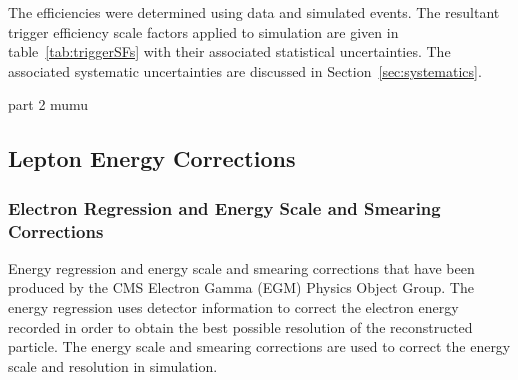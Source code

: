 The efficiencies were determined using data and simulated \ttbar events.
The resultant trigger efficiency scale factors applied to simulation are given in table~\ref{tab:triggerSFs} with their associated statistical uncertainties.
The associated systematic uncertainties are discussed in Section~\ref{sec:systematics}.

\begin{table}[htbp]
\label{tab:triggerSFs}
  \centering
\end{table}

 part 2 mumu


\subsection{Lepton Energy Corrections}\label{subsec:leptonEnergyCorrections}
\subsubsection{Electron Regression and Energy Scale and Smearing Corrections}
Energy regression and energy scale and smearing corrections that have been produced by the CMS Electron Gamma (EGM) Physics Object Group.
The energy regression uses detector information to correct the electron energy recorded in order to obtain the best possible resolution of the reconstructed particle.
The energy scale and smearing corrections are used to correct the energy scale and resolution in simulation.

